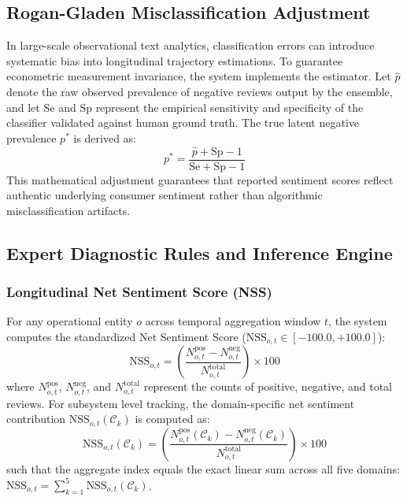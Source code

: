 \documentclass[5p,twocolumn,authoryear]{elsarticle}
\begin{document}
\subsection{Rogan-Gladen Misclassification Adjustment}
In large-scale observational text analytics, classification errors can introduce systematic bias into longitudinal trajectory estimations. To guarantee econometric measurement invariance, the system implements the \citet{rogan1978estimating} estimator. Let $\hat{p}$ denote the raw observed prevalence of negative reviews output by the ensemble, and let $\mathrm{Se}$ and $\mathrm{Sp}$ represent the empirical sensitivity and specificity of the classifier validated against human ground truth. The true latent negative prevalence $p^*$ is derived as:
\begin{equation}
p^* = \frac{\hat{p} + \mathrm{Sp} - 1}{\mathrm{Se} + \mathrm{Sp} - 1}
\end{equation}
This mathematical adjustment guarantees that reported sentiment scores reflect authentic underlying consumer sentiment rather than algorithmic misclassification artifacts.

\subsection{Expert Diagnostic Rules and Inference Engine}

\subsubsection{Longitudinal Net Sentiment Score (NSS)}
For any operational entity $o$ across temporal aggregation window $t$, the system computes the standardized Net Sentiment Score ($\text{NSS}_{o,t} \in [-100.0, +100.0]$):
\begin{equation}
\text{NSS}_{o,t} = \left( \frac{N_{o,t}^{\text{pos}} - N_{o,t}^{\text{neg}}}{N_{o,t}^{\text{total}}} \right) \times 100
\end{equation}
where $N_{o,t}^{\text{pos}}$, $N_{o,t}^{\text{neg}}$, and $N_{o,t}^{\text{total}}$ represent the counts of positive, negative, and total reviews. For subsystem level tracking, the domain-specific net sentiment contribution $\text{NSS}_{o,t}(\mathcal{C}_k)$ is computed as:
\begin{equation}
\text{NSS}_{o,t}(\mathcal{C}_k) = \left( \frac{N_{o,t}^{\text{pos}}(\mathcal{C}_k) - N_{o,t}^{\text{neg}}(\mathcal{C}_k)}{N_{o,t}^{\text{total}}} \right) \times 100
\end{equation}
such that the aggregate index equals the exact linear sum across all five domains: $\text{NSS}_{o,t} = \sum_{k=1}^5 \text{NSS}_{o,t}(\mathcal{C}_k)$.
\end{document}
